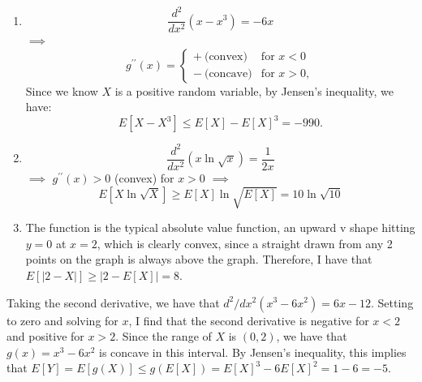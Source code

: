 \begin{problem}{25}$ $
\begin{enumerate}
\item 
\begin{equation*}
\frac{d^2}{dx^2}(x-x^3) = -6x
\end{equation*}
$\implies$ 
\[
  g^{\prime \prime}(x) =
  \begin{cases}
                                   +~\text{(convex)}& \text{for $x<0$} \\
                                   -~\text{(concave)} &  \text{for $x>0$} ,
  \end{cases}
\]
Since we know $X$ is a positive random variable, by Jensen's inequality, we have:
\begin{equation*}
E[X-X^3] \le E[X]-E[X]^3 = -990.
\end{equation*}

\item

\begin{equation*}
\frac{d^2}{dx^2}(x\ln \sqrt{x}) = \frac{1}{2x}
\end{equation*}
$\implies$ 
$ g^{\prime \prime}(x)>0$ (convex) for $x>0$
$\implies$ 
\begin{equation*}
E[X\ln \sqrt{X}] \ge E[X]\ln \sqrt{E[X]}= 10 \ln \sqrt{10}
\end{equation*}

\item  The function is the typical absolute value function, an upward v shape hitting $y=0$ at $x=2$, which is clearly convex, since a straight drawn from any 2 points on the graph is always above the graph.  Therefore, I have that $E[|2-X|]\ge |2-E[X]| = 8.$
\end{enumerate}

\end{problem}

\begin{problem}{26} Taking the second derivative, we have that $d^2/dx^2 (x^3-6x^2) = 6x-12$.  Setting to zero and solving for $x$, I find that the second derivative is negative for $x<2$ and positive for $x>2$.  Since the range of $X$ is $(0,2)$, we have that $g(x) = x^3-6x^2$ is concave in this interval.  By Jensen's inequality, this implies that $E[Y] = E[g(X)] \le g(E[X]) = E[X]^3-6E[X]^2 = 1-6 = -5$.

\end{problem}

